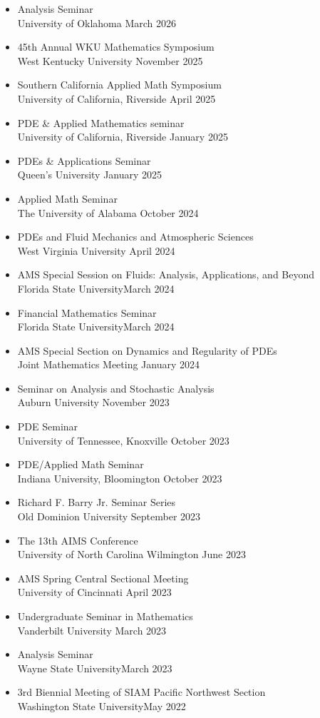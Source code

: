 \documentclass[12pt]{article}
\newenvironment{innerlist}[1][\enskip\textbullet]%
        {\begin{itemize}[#1,leftmargin=*,parsep=0pt,itemsep=0pt,topsep=0pt,partopsep=0pt]}
        {\end{itemize}}
\begin{document}
\begin{innerlist}
\item Analysis Seminar \\
University of Oklahoma \hfill March 2026
\item 45th Annual WKU Mathematics Symposium
\\
West Kentucky University \hfill November 2025
\item Southern California Applied Math Symposium\\
University of California, Riverside \hfill April 2025
\item PDE \& Applied Mathematics seminar\\ University of California, Riverside \hfill January 2025
\item PDEs \& Applications Seminar\\ Queen’s University \hfill January 2025
\item Applied Math Seminar\\
The University of Alabama \hfill October 2024
\item PDEs and Fluid Mechanics and Atmospheric Sciences\\
West Virginia University \hfill April 2024
\item AMS Special Session on Fluids: Analysis, Applications, and Beyond\\
Florida State University\hfill March 2024
\item Financial Mathematics Seminar\\
Florida State University\hfill March 2024
\item AMS Special Section on Dynamics and Regularity of PDEs\\
Joint Mathematics Meeting \hfill January 2024
\item Seminar on Analysis and Stochastic Analysis \\
Auburn University  \hfill November 2023
\item PDE Seminar\\
University of Tennessee, Knoxville \hfill October 2023
\item PDE/Applied Math Seminar\\ Indiana University, Bloomington \hfill October 2023    
\item Richard F. Barry Jr. Seminar Series\\
Old Dominion University \hfill September 2023
\item The 13th AIMS Conference \\
University of North Carolina Wilmington \hfill June 2023
\item AMS Spring Central Sectional Meeting\\
University of Cincinnati \hfill April 2023
\item Undergraduate Seminar in Mathematics\\
Vanderbilt University \hfill March 2023
\item Analysis Seminar\\
Wayne State University\hfill March 2023
\item 3rd Biennial Meeting of SIAM Pacific Northwest Section\\ Washington State University\hfill May 2022


\end{innerlist}
\end{document}
